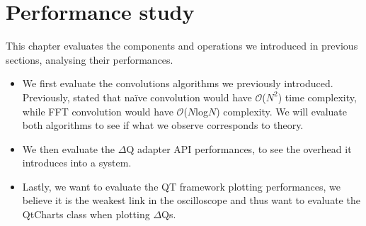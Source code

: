 \chapter{Performance study}
    This chapter evaluates the components and operations we introduced in previous sections, analysing their performances.
    \begin{itemize}
        \item We first evaluate the convolutions algorithms we previously introduced. Previously, stated that naïve convolution would have $\mathcal{O}$($N^2$) time complexity, while FFT convolution would have $\mathcal{O}$($N$log$N$) complexity. We will evaluate both algorithms to see if what we observe corresponds to theory.
        \item We then evaluate the $\Delta$Q adapter API performances, to see the overhead it introduces into a system.
        \item Lastly, we want to evaluate the QT framework plotting performances, we believe it is the weakest link in the oscilloscope and thus want to evaluate the QtCharts class when plotting $\Delta$Qs. 
    \end{itemize}

    
     
    
